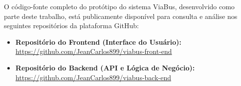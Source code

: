 \begin{apendicesenv}
  O código-fonte completo do protótipo do sistema ViaBus, desenvolvido como parte deste trabalho, está publicamente disponível para consulta e análise nos seguintes repositórios da plataforma GitHub:

  \vspace{1cm}

  \begin{itemize}
    \item \textbf{Repositório do Frontend (Interface do Usuário):} \\
          \url{https://github.com/JeanCarlos899/viabus-front-end}

    \item \textbf{Repositório do Backend (API e Lógica de Negócio):} \\
          \url{https://github.com/JeanCarlos899/viabus-back-end}
  \end{itemize}

\end{apendicesenv}